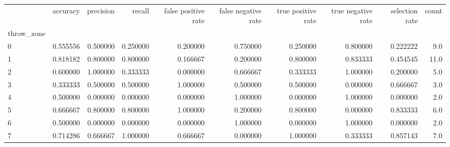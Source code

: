 \begin{tabular}{lrrrrrrrrr}
\toprule
{} &  accuracy &  precision &    recall &  false positive rate &  false negative rate &  true positive rate &  true negative rate &  selection rate &  count \\
throw\_zone &           &            &           &                      &                      &                     &                     &                 &        \\
\midrule
0          &  0.555556 &   0.500000 &  0.250000 &             0.200000 &             0.750000 &            0.250000 &            0.800000 &        0.222222 &    9.0 \\
1          &  0.818182 &   0.800000 &  0.800000 &             0.166667 &             0.200000 &            0.800000 &            0.833333 &        0.454545 &   11.0 \\
2          &  0.600000 &   1.000000 &  0.333333 &             0.000000 &             0.666667 &            0.333333 &            1.000000 &        0.200000 &    5.0 \\
3          &  0.333333 &   0.500000 &  0.500000 &             1.000000 &             0.500000 &            0.500000 &            0.000000 &        0.666667 &    3.0 \\
4          &  0.500000 &   0.000000 &  0.000000 &             0.000000 &             1.000000 &            0.000000 &            1.000000 &        0.000000 &    2.0 \\
5          &  0.666667 &   0.800000 &  0.800000 &             1.000000 &             0.200000 &            0.800000 &            0.000000 &        0.833333 &    6.0 \\
6          &  0.500000 &   0.000000 &  0.000000 &             0.000000 &             1.000000 &            0.000000 &            1.000000 &        0.000000 &    2.0 \\
7          &  0.714286 &   0.666667 &  1.000000 &             0.666667 &             0.000000 &            1.000000 &            0.333333 &        0.857143 &    7.0 \\
\bottomrule
\end{tabular}
